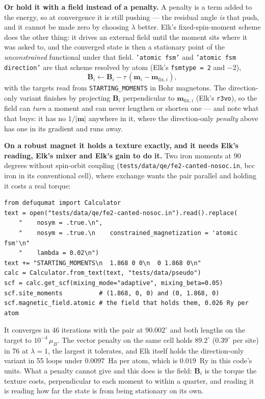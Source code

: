 \documentclass[11pt,a4paper]{article}
\newcommand{\code}[1]{\texttt{\small #1}}
\begin{document}
\textbf{Or hold it with a field instead of a penalty.} A penalty is a term
added to the energy, so at convergence it is still pushing --- the residual
angle \emph{is} that push, and it cannot be made zero by choosing $\lambda$
better. Elk's fixed-spin-moment scheme does the other thing: it drives an
external field until the moment sits where it was asked to, and the converged
state is then a stationary point of the \emph{unconstrained} functional under
that field. \code{'atomic fsm'} and \code{'atomic fsm direction'} are that
scheme resolved by atom (Elk's \code{fsmtype = 2} and $-2$),
%
\[
  \mathbf B_i \leftarrow \mathbf B_i - \tau\,(\mathbf m_i - \mathbf m_{\mathrm{fix},i}),
\]
%
with the targets read from \code{STARTING\_MOMENTS} in Bohr magnetons. The
direction-only variant finishes by projecting $\mathbf B_i$ perpendicular to
$\mathbf m_{\mathrm{fix},i}$ (Elk's \code{r3vo}), so the field can \emph{turn} a
moment and can never lengthen or shorten one --- and note what that buys: it has
no $1/|\mathbf m|$ anywhere in it, where the direction-only \emph{penalty} above
has one in its gradient and runs away.

\textbf{On a robust magnet it holds a texture exactly, and it needs Elk's
reading, Elk's mixer and Elk's gain to do it.} Two iron moments at 90 degrees
without spin-orbit coupling (\code{tests/data/qe/fe2-canted-nosoc.in}, bcc iron
in its conventional cell), where exchange wants the pair parallel and holding it
costs a real torque:
%
\begin{verbatim}
from defuqumat import Calculator
text = open("tests/data/qe/fe2-canted-nosoc.in").read().replace(
    "    nosym = .true.\n",
    "    nosym = .true.\n    constrained_magnetization = 'atomic fsm'\n"
    "    lambda = 0.02\n")
text += "STARTING_MOMENTS\n  1.868 0 0\n  0 1.868 0\n"
calc = Calculator.from_text(text, "tests/data/pseudo")
scf = calc.get_scf(mixing_mode="adaptive", mixing_beta=0.05)
scf.site_moments          # (1.868, 0, 0) and (0, 1.868, 0)
scf.magnetic_field.atomic # the field that holds them, 0.026 Ry per atom
\end{verbatim}
%
It converges in 46 iterations with the pair at $90.002^\circ$ and both lengths on
the target to $10^{-4}\,\mu_B$. The vector penalty on the same cell holds
$89.2^\circ$ ($0.39^\circ$ per site) in 76 at $\lambda = 1$, the largest it
tolerates, and Elk itself holds the direction-only variant in 55 loops under
$0.0097$~Ha per atom, which is $0.019$~Ry in this code's units. What a penalty
cannot give and this does is the field: $\mathbf B_i$ is the torque the texture
costs, perpendicular to each moment to within a quarter, and reading it is
reading how far the state is from being stationary on its own.
\end{document}
